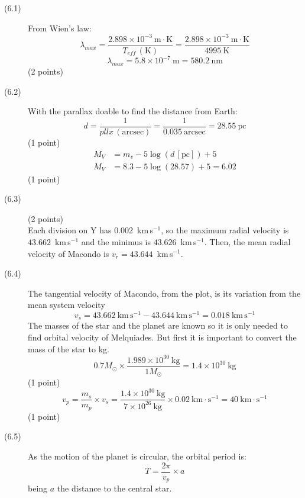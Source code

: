 \begin{description}
\item[(6.1)] From Wien's law:
\[ \lambda_{max} = \frac{2.898\times10^{-3}\ \mathrm{m\cdot K}}{T_{eff}\,(\mathrm{K})}
   = \frac{2.898\times10^{-3}\ \mathrm{m\cdot K}}{4995\ \mathrm{K}} \]
\[ \lambda_{max} = 5.8\times10^{-7}\ \mathrm{m} = 580.2\ \mathrm{nm} \]
\hfill(2 points)

\item[(6.2)] With the parallax doable %
to find the distance from Earth:
\[ d = \frac{1}{pllx\,(\mathrm{arcsec})} = \frac{1}{0.035\ \mathrm{arcsec}}
     = 28.55\ \mathrm{pc} \]
\hfill(1 point)
\begin{align*}
M_V &= m_v - 5\log(d\,[\mathrm{pc}]) + 5\\
M_V &= 8.3 - 5\log(28.57) + 5 = 6.02
\end{align*}
\hfill(1 point)

\item[(6.3)] \hfill(2 points)\\
Each division on Y has 0.002~km\,s$^{-1}$, so the maximum radial velocity is
$43.662$~km\,s$^{-1}$ and the minimus %
is $43.626$~km\,s$^{-1}$. Then, the mean radial velocity of Macondo is
$v_r = 43.644$~km\,s$^{-1}$.

\item[(6.4)] The tangential velocity of Macondo, from the plot, is its
variation from the mean system velocity
\[ v_s = 43.662\ \mathrm{km\,s^{-1}} - 43.644\ \mathrm{km\,s^{-1}}
       = 0.018\ \mathrm{km\,s^{-1}} \]
The masses of the star and the planet are known so it is only needed to find
orbital velocity of Melquiades. But first it is important to convert the mass
of the star to kg.
\[ 0.7M_\odot \times \frac{1.989\times10^{30}\ \mathrm{kg}}{1M_\odot}
   = 1.4\times10^{30}\ \mathrm{kg} \]
\hfill(1 point)
\[ v_p = \frac{m_s}{m_p}\times v_s
       = \frac{1.4\times10^{30}\ \mathrm{kg}}{7\times10^{26}\ \mathrm{kg}}
         \times 0.02\ \mathrm{km\cdot s^{-1}}
       = 40\ \mathrm{km\cdot s^{-1}} \]
\hfill(1 point)

\item[(6.5)] As the motion of the planet is circular, the orbital period is:
\[ T = \frac{2\pi}{v_p}\times a \]
being $a$ the distance to the central star.


\end{description}
